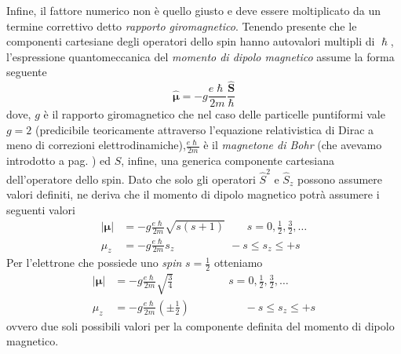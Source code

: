 Infine, il fattore numerico non è quello giusto e deve essere moltiplicato da un termine correttivo detto \emph{rapporto giromagnetico}.
Tenendo presente che le componenti cartesiane degli operatori dello spin hanno autovalori multipli di $\hslash$, l’espressione quantomeccanica del \emph{momento di dipolo magnetico} assume la forma seguente
\begin{equation}
	\hat{\bm{\mu}} = - g  \frac{e\hslash}{2 m} \frac{\hat{\bm{S}}}{\hslash}
	\label{eq:quantum-magnetic-dipole-moment}
\end{equation}
dove, $g$ è il rapporto giromagnetico che nel caso delle particelle puntiformi vale $g=2$ (predicibile teoricamente attraverso l’equazione relativistica di Dirac a meno di correzioni elettrodinamiche),$\frac{e\hslash}{2m}$ è il \emph{magnetone di Bohr} (che avevamo introdotto a pag. \pageref{eq:qm-magnetic-dipole-moment}) ed $S$, infine, una generica componente cartesiana dell’operatore dello spin.
Dato che solo gli operatori ${\hat{S}}^{2}$ e ${\hat{S}}_{z}$ possono assumere valori definiti, ne deriva che il momento di dipolo magnetico potrà assumere i seguenti valori
\begin{align*}
	| \bm{\mu} | &= -g  \frac{e\hslash}{2m} \sqrt{ s(s+1) } \qquad s= 0, \frac{1}{2}, \frac{3}{2}, \dots \\
	\mu_{z} &= -g  \frac{e\hslash}{2m} s_{z} \qquad \quad \qquad-s \leq s_{z} \leq +s
\end{align*}
Per l'elettrone che possiede uno \emph{spin} $s = \frac{1}{2}$ otteniamo
\begin{align*}
	| \bm{\mu} | &= -g  \frac{e\hslash}{2m} \sqrt{ \frac{3}{4} } \qquad \qquad \quad  s= 0, \frac{1}{2}, \frac{3}{2}, \dots \\
	\mu_{z} &= -g  \frac{e\hslash}{2m} \left( \pm \frac{1}{2} \right) \qquad \quad \qquad-s \leq s_{z} \leq +s
\end{align*}
ovvero due soli possibili valori per la componente definita del momento di dipolo magnetico.

